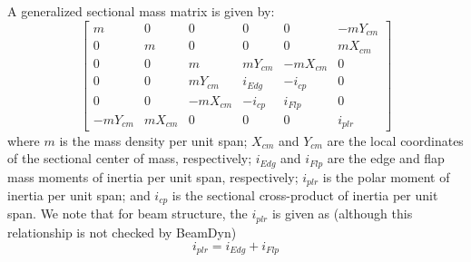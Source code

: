 A generalized sectional mass matrix is given by:
\begin{equation}
    \label{Mass}
    \begin{bmatrix}
    m & 0 & 0 & 0 & 0 & -m Y_{cm} \\
    0 & m & 0 & 0 & 0 & m X_{cm}\\
    0 & 0& m & m Y_{cm} & -m X_{cm} & 0 \\
    0 & 0 & m Y_{cm} & i_{Edg} & -i_{cp} & 0 \\
    0 & 0 &-m X_{cm} & -i_{cp} & i_{Flp} & 0 \\
    -m Y_{cm} & m X_{cm} & 0 & 0 & 0 & i_{plr}
    \end{bmatrix}
\end{equation}
where $m$ is the mass density per unit span; $X_{cm}$ and $Y_{cm}$ are the local coordinates of the sectional center of mass, respectively; $i_{Edg}$ and $i_{Flp}$ are the edge and flap mass moments of inertia per unit span, respectively; $i_{plr}$ is the polar moment of inertia per unit span; and $i_{cp}$ is the sectional cross-product of inertia per unit span. 
We note that for beam structure, the $i_{plr}$ is given as  (although this relationship is not checked by BeamDyn)
\begin{equation}
    \label{PolarMOI} %
    i_{plr} = i_{Edg} + i_{Flp}
\end{equation}


